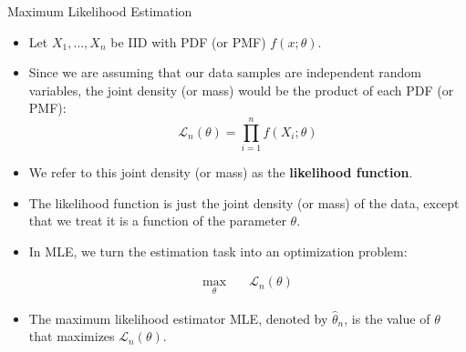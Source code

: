 \documentclass[handout]{beamer}
\begin{document}
\begin{frame}{Maximum Likelihood Estimation}
\scriptsize{
\begin{itemize}
 \item Let $X_1,\dots,X_n$ be IID with PDF (or PMF) $f(x;\theta)$.
 \item Since we are assuming that our data samples are independent random variables, the joint density (or mass) would be the product of each PDF (or PMF): 
 \begin{displaymath}
\mathcal{L}_{n}(\theta)=\prod_{i=1}^nf(X_i;\theta)  
 \end{displaymath}
\item We refer to this joint density (or mass) as the \textbf{likelihood function}.
\item The likelihood function is just the joint density (or mass) of the data, except that we treat it is a function of the parameter $\theta$.

\item In MLE, we turn the estimation task into an optimization problem:

\begin{center}
\begin{equation}
\begin{split}
\max_{\theta} & \quad \mathcal{L}_{n}(\theta)
\end{split}
\end{equation}
\end{center}

\item The maximum likelihood estimator MLE, denoted by $\hat{\theta}_n$, is the value of $\theta$ that maximizes $\mathcal{L}_{n}(\theta)$.
 
\end{itemize}


} 
 
\end{frame}
\end{document}
